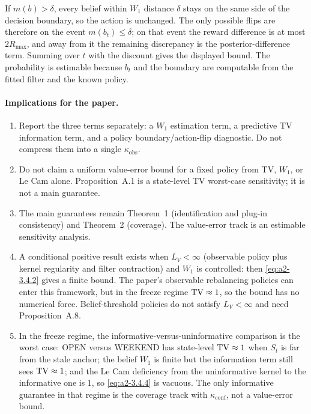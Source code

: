 \begin{proofsketch}
If $m(b)>\delta$, every belief within $W_1$ distance $\delta$ stays on the same
side of the decision boundary, so the action is unchanged.  The only possible
flips are therefore on the event $m(b_t)\le\delta$; on that event the reward
difference is at most $2R_{\max}$, and away from it the remaining discrepancy is
the posterior-difference term.  Summing over $t$ with the discount gives the
displayed bound.  The probability is estimable because $b_t$ and the boundary
are computable from the fitted filter and the known policy.
\end{proofsketch}

\paragraph{Implications for the paper.}
\begin{enumerate}
\item Report the three terms separately: a $W_1$ estimation term, a predictive
TV information term, and a policy boundary/action-flip diagnostic.  Do not
compress them into a single $\kappa_{\mathrm{obs}}$.
\item Do not claim a uniform value-error bound for a fixed policy from
TV, $W_1$, or Le Cam alone.  Proposition~A.1 is a state-level TV worst-case
sensitivity; it is not a main guarantee.
\item The main guarantees remain Theorem~1 (identification and plug-in
consistency) and Theorem~2 (coverage).  The value-error track is an estimable
sensitivity analysis.
\item A conditional positive result exists when $L_V<\infty$ (observable policy
plus kernel regularity and filter contraction) and $W_1$ is controlled: then
\eqref{eq:a2-3.4.2} gives a finite bound.  The paper's observable
rebalancing policies can enter this framework, but in the freeze
regime $\mathrm{TV}\approx1$, so the bound has no numerical force.  Belief-threshold
policies do not satisfy $L_V<\infty$ and need Proposition~A.8.
\item In the freeze regime, the informative-versus-uninformative comparison is
the worst case: OPEN versus WEEKEND has state-level $\mathrm{TV}\approx1$ when $S_t$ is
far from the stale anchor; the belief $W_1$ is finite but the information term
still sees $\mathrm{TV}\approx1$; and the Le Cam deficiency from the uninformative
kernel to the informative one is $1$, so \eqref{eq:a2-3.4.4} is vacuous.  The only
informative guarantee in that regime is the coverage track with
$\kappa_{\mathrm{conf}}$, not a value-error bound.
\end{enumerate}

\let\theHequation\aIItheHequation
